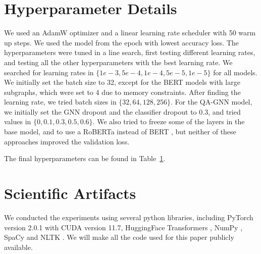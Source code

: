 \documentclass[11pt]{article}
\begin{document}


\appendix

\section{Hyperparameter Details}
\label{sec:app_hyperparameters}

We used an AdamW optimizer \citep{loshchilov2017decoupled_adamw} and a linear learning rate scheduler with 50 warm up steps. We used the model from the epoch with lowest accuracy loss. The hyperparameters were tuned in a line search, first testing different learning rates, and testing all the other hyperparameters with the best learning rate. We searched for learning rates in $\{1e-3, 5e-4, 1e-4, 5e-5, 1e-5\}$ for all models. We initially set the batch size to 32, except for the BERT models with large subgraphs, which were set to 4 due to memory constraints. After finding the learning rate, we tried batch sizes in $\{32, 64, 128, 256\}$. For the QA-GNN model, we initially set the GNN dropout and the classifier dropout to 0.3, and tried values in $\{0, 0.1, 0.3, 0.5, 0.6\}$. We also tried to freeze some of the layers in the base model, and to use a RoBERTa \citep{liu2019roberta} instead of BERT \citep{devlin2018bert}, but neither of these approaches improved the validation loss.



The final hyperparameters can be found in Table~\ref{sec:app_hyperparameters}.

\section{Scientific Artifacts}
\label{sec:app_artifacts}

We conducted the experiments using several python libraries, including PyTorch version 2.0.1 \citep{paszke2019pytorch} with CUDA version 11.7, HuggingFace Transformers \citep{wolf2020transformers}, NumPy \citep{harris2020numpy}, SpaCy \citep{spacy2} and NLTK \citep{bird2009nltk}. We will make all the code used for this paper publicly available.
\end{document}
